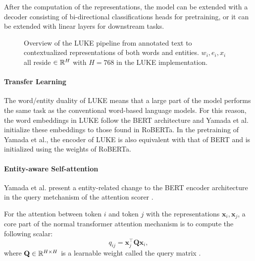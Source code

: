 \documentclass[main.tex]{subfiles}
\begin{document}
After the computation of the representations, the model can be extended with a decoder consisting of bi-directional classifications heads for pretraining, or it can be extended with linear layers for downstream tasks.
\begin{figure}[H]
    \centering
        
    \caption{
        Overview of the LUKE pipeline from annotated text to contextualized representations of both words and entities.
        $w_i, e_i, x_i$ all reside $\in \mathbb R^H$ with $H=768$ in the LUKE implementation.
    }
    \label{fig:luke}
\end{figure}\noindent

\paragraph{Transfer Learning}
The word/entity duality of LUKE means that a large part of the model performs the same task as the conventional word-based language models.
For this reason, the word embeddings in LUKE follow the BERT architecture and Yamada et al. initialize these embeddings to those found in RoBERTa.
In the pretraining of Yamada et al., the encoder of LUKE is also equivalent with that of BERT and is initialized using the weights of RoBERTa.


\paragraph{Entity-aware Self-attention}
\label{subsubsec:entityaware}
Yamada et al. present a entity-related change to the BERT encoder architecture in the query metchanism of the attention scorer \cite[Sec. 3.2]{yamada2020luke}.

For the attention between token $i$ and token $j$ with the representations $\mathbf x_i, \mathbf x_j$, a core part of the normal transformer attention mechanism is to compute the following scalar:
\begin{equation}
    q_{ij} = \mathbf x_j^\top \mathbf Q \mathbf x_i,
\end{equation}
where $\mathbf Q\in \mathbb R^{H\times H}$ is a learnable weight called the query matrix \cite[Sec. 3.2.1]{vaswani2017att}.
\end{document}
